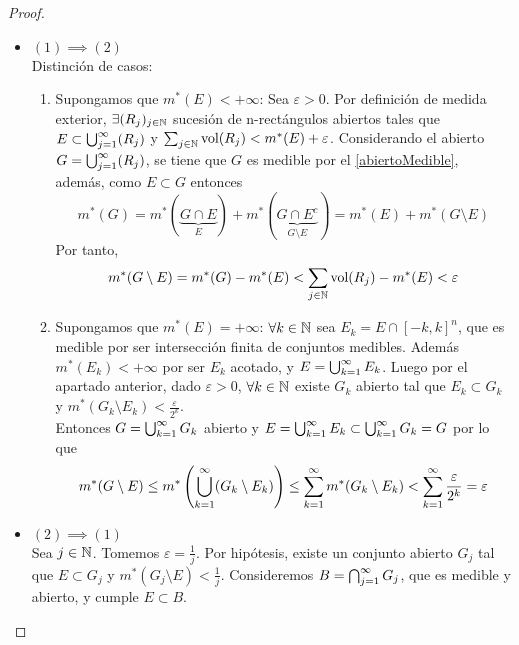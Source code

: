 \begin{proof}
    \leavevmode
    \begin{itemize}
        \item $(1) \implies (2)$\\
              Distinción de casos:
              \begin{enumerate}
                  \item Supongamos que $m^*(E) < +\infty$: Sea $\varepsilon > 0$. Por definición de
                        medida exterior, $\exists (R_j)_{j \in \mathbb{N}}$ sucesión de n-rectángulos abiertos
                        tales que $E \subset \bigcup_{j=1}^{\infty}(R_j)$ y $\sum_{j \in \mathbb{N}} \text{vol}(R_j) < m^*(E) +
                            \varepsilon$. Considerando el abierto $G = \bigcup_{j=1}^{\infty}(R_j)$, se tiene que $G$ es
                        medible por el \cref{abiertoMedible}, además, como $E \subset G$ entonces
                        $$m^*(G) = m^*(\underbrace{G \cap E}_{E}) + m^*(\underbrace{G \cap E^c}_{G
                                \setminus E}) = m^*(E) + m^*(G \setminus E)$$ Por tanto, $$m^*(G \setminus E) =
                            m^*(G) - m^*(E) < \sum_{j \in \mathbb{N}} \text{vol}(R_j) - m^*(E) < \varepsilon$$
                  \item Supongamos que $m^*(E) = +\infty$: $\forall k \in \mathbb{N}$ sea $E_k = E \cap
                            [-k,k]^n$, que es medible por ser intersección finita de conjuntos medibles.
                        Además $m^*(E_k) < +\infty$ por ser $E_k$ acotado, y $E = \bigcup_{k=1}^{\infty}{E_k}$. Luego por
                        el apartado anterior, dado $\varepsilon > 0$, $\forall k \in \mathbb{N}$ existe $G_k$
                        abierto tal que $E_k \subset G_k$ y $m^*(G_k \setminus E_k) <
                            \frac{\varepsilon}{2^k}$.\\
                            Entonces $G = \bigcup_{k=1}^{\infty}{G_k}$ abierto y $E = \bigcup_{k=1}^{\infty}{E_k}
                            \subset \bigcup_{k=1}^{\infty}{G_k} = G$ por lo que $$m^*(G \setminus E) \leq m^*\left(\bigcup_{k=1}^{\infty}(G_k
                            \setminus E_k)\right) \leq \sum_{k=1}^{\infty}{m^*(G_k \setminus E_k)} < \sum_{k=1}^{\infty}{\frac{\varepsilon}{2^k}}
                            = \varepsilon$$
              \end{enumerate}
        \item $(2) \implies (1)$\\
        Sea \( j \in \mathbb{N} \). Tomemos \(\varepsilon = \frac{1}{j}\). Por hipótesis, existe un conjunto abierto \( G_j \) tal que \( E \subset G_j \) y \( m^*(G_j \setminus E) < \frac{1}{j} \). Consideremos \( B = \bigcap_{j=1}^{\infty}{G_j} \), que es medible y abierto, y cumple \( E \subset B \).


\end{itemize}
\end{proof}
